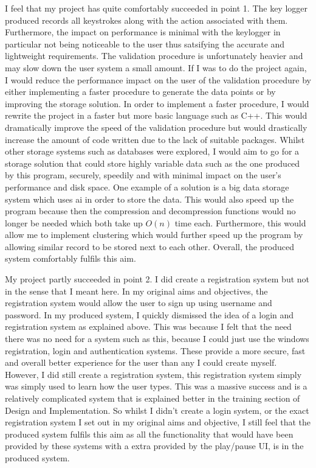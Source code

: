 \documentclass[10pt,a4paper]{report}
\begin{document}
I feel that my project has quite comfortably succeeded in point 1. The key logger produced records all keystrokes along with the action associated with them. Furthermore, the impact on performance is minimal with the keylogger in particular not being noticeable to the user thus satsifying the accurate and lightweight requirements. The validation procedure is unfortunately heavier and may slow down the user system a small amount. If I was to do the project again, I would reduce the performance impact on the user of the validation procedure by either implementing a faster procedure to generate the data points or by improving the storage solution. In order to implement a faster procedure, I would rewrite the project in a faster but more basic language such as C++. This would dramatically improve the speed of the validation procedure but would drastically increase the amount of code written due to the lack of suitable packages. Whilst other storage systems such as databases were explored, I would aim to go for a storage solution that could store highly variable data such as the one produced by this program, securely, speedily and with minimal impact on the user's performance and disk space. One example of a solution is a big data storage system which uses ai in order to store the data. This would also speed up the program because then the compression and decompression functions would no longer be needed which both take up \(O(n)\) time each. Furthermore, this would allow me to implement clustering which would further speed up the program by allowing similar record to be stored next to each other. Overall, the produced system comfortably fulfils this aim.

My project partly succeeded in point 2. I did create a registration system but not in the sense that I meant here. In my original aims and objectives, the registration system would allow the user to sign up using username and password. In my produced system, I quickly dismissed the idea of a login and registration system as explained above. This was because I felt that the need there was no need for a system such as this, because I could just use the windows registration, login and authentication systems. These provide a more secure, fast and overall better experience for the user than any I could create myself. However, I did still create a registration system, this registration system simply was simply used to learn how the user types. This was a massive success and is a relatively complicated system that is explained better in the training section of Design and Implementation. So whilst I didn't create a login system, or the exact registration system I set out in my original aims and objective, I still feel that the produced system fulfils this aim as all the functionality that would have been provided by these systems with a extra provided by the play/pause UI, is in the produced system.
\end{document}
